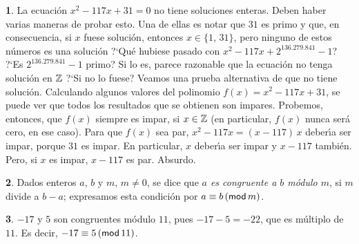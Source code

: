 \theoremstyle{plain}
\newtheorem{teoCongruencias}{\teoname}[section]
\newtheorem{coroCongruencias}[teoCongruencias]{\coroname}
\newtheorem{lemaCongruencias}[teoCongruencias]{\lemaname}

\theoremstyle{definition}
\newtheorem{defCongruencias}[teoCongruencias]{}
\newtheorem{obsCongruencias}[teoCongruencias]{\obsname}
\newtheorem{ejemCongruencias}[teoCongruencias]{\ejemname}
\newtheorem{pregCongruencias}[teoCongruencias]{\pregname}


\begin{ejemCongruencias}\label{ejem:congruencias:motiva}
	La ecuaci\'on $x^2-117x+31=0$ no tiene soluciones enteras.
	Deben haber varias maneras de probar esto. Una de ellas es notar
	que $31$ es primo y que, en consecuencia, si $x$ fuese soluci\'on,
	entonces $x\in\{1,\,31\}$, pero ninguno de estos n\'umeros es una
	soluci\'on ?`Qu\'e hubiese pasado con $x^2-117x+2^{136.279.841}-1$?
	?`Es $2^{136.279.841}-1$ primo? Si lo es, parece razonable que la
	ecuaci\'on no tenga soluci\'on en $\Enteros$ ?`Si no lo fuese?
	Veamos una prueba alternativa de que no tiene soluci\'on. Calculando
	algunos valores del polinomio $f(x)=x^2-117x+31$, se puede ver que
	todos los resultados que se obtienen son impares. Probemos, entonces,
	que $f(x)$ siempre es impar, si $x\in\Enteros$ (en particular, $f(x)$
	nunca ser\'a cero, en ese caso). Para que $f(x)$ sea par,
	$x^2-117x=(x-117)\,x$ deber\'{\i}a ser impar, porque $31$ es impar.
	En particular, $x$ deber\'{\i}a ser impar y $x-117$ tambi\'en. Pero,
	si $x$ es impar, $x-117$ es par. Absurdo.
\end{ejemCongruencias}

\begin{defCongruencias}\label{def:congruencias}
	Dados enteros $a$, $b$ y $m$, $m\neq 0$, se dice que
	\emph{$a$ es congruente a $b$ m\'odulo $m$}, si $m$ divide a $b-a$;
	expresamos esta condici\'on por $a\equiv b\tmodulo[m]$.
\end{defCongruencias}

\begin{ejemCongruencias}\label{ejem:congruencias}
	$-17$ y $5$ son congruentes m\'odulo $11$, pues $-17-5=-22$, que
	es m\'ultiplo de $11$. Es decir, $-17\equiv 5\tmodulo[11]$.
\end{ejemCongruencias}

